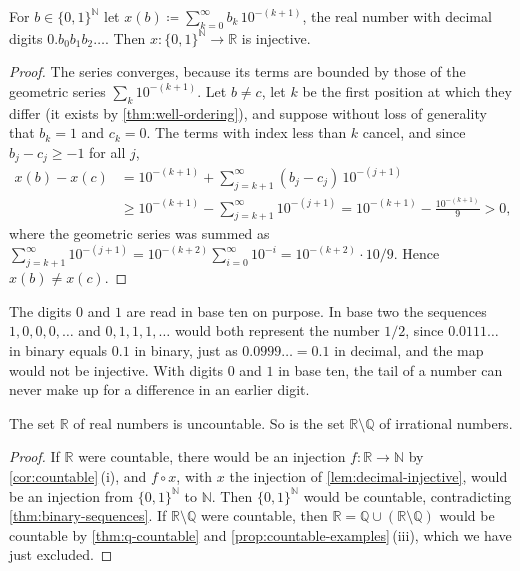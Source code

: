 \begin{lemma}
\label{lem:decimal-injective}
For $b\in\{0,1\}^{\mathbb N}$ let $x(b)\coloneqq\sum_{k=0}^{\infty}b_k\,10^{-(k+1)}$, the real number with decimal digits $0.b_0b_1b_2\ldots$. Then $x\colon\{0,1\}^{\mathbb N}\to\mathbb R$ is injective.
\end{lemma}

\begin{proof}
The series converges, because its terms are bounded by those of the geometric series $\sum_k10^{-(k+1)}$. Let $b\ne c$, let $k$ be the first position at which they differ (it exists by \cref{thm:well-ordering}), and suppose without loss of generality that $b_k=1$ and $c_k=0$. The terms with index less than $k$ cancel, and since $b_j-c_j\ge-1$ for all $j$,
\begin{align*}
x(b)-x(c)&=10^{-(k+1)}+\sum_{j=k+1}^{\infty}(b_j-c_j)\,10^{-(j+1)}\\
&\ge10^{-(k+1)}-\sum_{j=k+1}^{\infty}10^{-(j+1)}
=10^{-(k+1)}-\frac{10^{-(k+1)}}{9}>0,
\end{align*}
where the geometric series was summed as $\sum_{j=k+1}^\infty10^{-(j+1)}=10^{-(k+2)}\sum_{i=0}^\infty10^{-i}=10^{-(k+2)}\cdot10/9$. Hence $x(b)\ne x(c)$.
\end{proof}

The digits $0$ and $1$ are read in base ten on purpose. In base two the sequences $1,0,0,0,\ldots$ and $0,1,1,1,\ldots$ would both represent the number $1/2$, since $0.0111\ldots$ in binary equals $0.1$ in binary, just as $0.0999\ldots=0.1$ in decimal, and the map would not be injective. With digits $0$ and $1$ in base ten, the tail of a number can never make up for a difference in an earlier digit.

\begin{theorem}[Cantor]
\label{thm:r-uncountable}
The set $\mathbb R$ of real numbers is uncountable. So is the set $\mathbb R\setminus\mathbb Q$ of irrational numbers.
\end{theorem}

\begin{proof}
If $\mathbb R$ were countable, there would be an injection $f\colon\mathbb R\to\mathbb N$ by \cref{cor:countable}\,(i), and $f\circ x$, with $x$ the injection of \cref{lem:decimal-injective}, would be an injection from $\{0,1\}^{\mathbb N}$ to $\mathbb N$. Then $\{0,1\}^{\mathbb N}$ would be countable, contradicting \cref{thm:binary-sequences}. If $\mathbb R\setminus\mathbb Q$ were countable, then $\mathbb R=\mathbb Q\cup(\mathbb R\setminus\mathbb Q)$ would be countable by \cref{thm:q-countable} and \cref{prop:countable-examples}\,(iii), which we have just excluded.
\end{proof}

